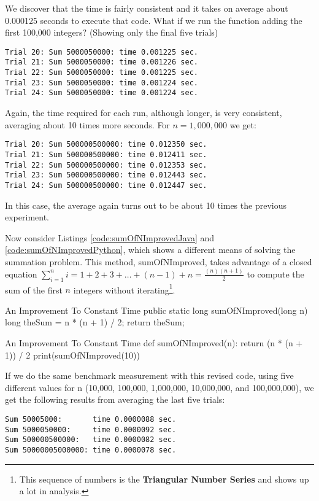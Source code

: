 We discover that the time is fairly consistent and it takes on average about 0.000125 seconds to execute that code. What if we run the function adding the first 100,000 integers? (Showing only the final five trials)

\begin{verbatim}
Trial 20: Sum 5000050000: time 0.001225 sec.
Trial 21: Sum 5000050000: time 0.001226 sec.
Trial 22: Sum 5000050000: time 0.001225 sec.
Trial 23: Sum 5000050000: time 0.001224 sec.
Trial 24: Sum 5000050000: time 0.001224 sec.
\end{verbatim}


Again, the time required for each run, although longer, is very consistent, averaging about 10 times more seconds. For $n = 1,000,000$  we get:

\begin{verbatim}
Trial 20: Sum 500000500000: time 0.012350 sec.
Trial 21: Sum 500000500000: time 0.012411 sec.
Trial 22: Sum 500000500000: time 0.012353 sec.
Trial 23: Sum 500000500000: time 0.012443 sec.
Trial 24: Sum 500000500000: time 0.012447 sec.
\end{verbatim}

In this case, the average again turns out to be about 10 times the previous experiment.

Now consider Listings \ref{code:sumOfNImprovedJava} and \ref{code:sumOfNImprovedPython}, which shows a different means of solving the summation problem. This method, sumOfNImproved, takes advantage of a closed equation $\sum_{i=1}^{n} i = 1+2+3+\dots+(n-1)+n =  \frac {(n)(n+1)}{2}$ to compute the sum of the first $n$ integers without iterating\footnote{This sequence of numbers is the \textbf{Triangular Number Series} and shows up a lot in analysis.}.

\begin{javacode}[label={code:sumOfNImprovedJava}]{An Improvement To Constant Time}
public static long sumOfNImproved(long n) { 
	long theSum = n * (n + 1) / 2;
	return theSum;
}
\end{javacode}


\begin{pycode}[label={code:sumOfNImprovedPython}]{An Improvement To Constant Time}
def sumOfNImproved(n):
	return (n * (n + 1)) / 2
print(sumOfNImproved(10))
\end{pycode}

If we do the same benchmark measurement with this revised code, using five different values for n (10,000, 100,000, 1,000,000, 10,000,000, and 100,000,000), we get the following results from averaging the last five trials:
\begin{verbatim}
Sum 50005000:       time 0.0000088 sec.
Sum 5000050000:     time 0.0000092 sec.
Sum 500000500000:   time 0.0000082 sec.
Sum 50000005000000: time 0.0000078 sec.
\end{verbatim}

